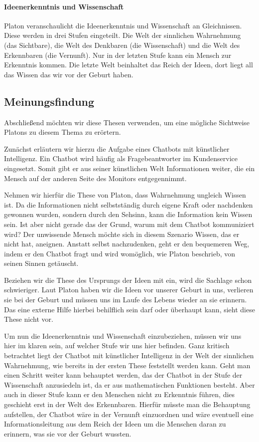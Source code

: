 \paragraph{Ideenerkenntnis und Wissenschaft}
Platon veranschaulicht die Ideenerkenntnis und Wissenschaft an Gleichnissen. Diese werden in drei Stufen eingeteilt. Die Welt der sinnlichen Wahrnehmung (das Sichtbare), die Welt des Denkbaren (die Wissenschaft) und die Welt des Erkennbaren (die Vernunft). Nur in der letzten Stufe kann ein Mensch zur Erkenntnis kommen. Die letzte Welt beinhaltet das Reich der Ideen, dort liegt all das Wissen das wir vor der Geburt haben.
	
\subsection{Meinungsfindung}
Abschließend möchten wir diese Thesen verwenden, um eine mögliche Sichtweise Platons zu diesem Thema zu erörtern.

Zunächst erläutern wir hierzu die Aufgabe eines Chatbots mit künstlicher Intelligenz. Ein Chatbot wird häufig als Fragebeantworter im Kundenservice eingesetzt. Somit gibt er aus seiner künstlichen Welt Informationen weiter, die ein Mensch auf der anderen Seite des Monitors entgegennimmt.

Nehmen wir hierfür die These von Platon, dass Wahrnehmung ungleich Wissen ist. Da die Informationen nicht selbstständig durch eigene Kraft oder  nachdenken gewonnen wurden, sondern durch den Sehsinn, kann die Information kein Wissen sein. Ist aber nicht gerade das der Grund, warum mit dem Chatbot kommuniziert wird? Der unwissende Mensch möchte sich in diesem Szenario Wissen, das er nicht hat, aneignen. Anstatt selbst nachzudenken, geht er den bequemeren Weg, indem er den Chatbot fragt und wird womöglich, wie Platon beschrieb, von seinen Sinnen getäuscht.

Beziehen wir die These des Ursprungs der Ideen mit ein, wird die Sachlage schon schwieriger. Laut Platon haben wir die Ideen vor unserer Geburt in uns, verlieren sie bei der Geburt und müssen uns im  Laufe des Lebens wieder an sie erinnern. Das eine externe Hilfe hierbei behilflich sein darf oder überhaupt kann, sieht diese These nicht vor.

Um nun die Ideenerkenntnis und Wissenschaft einzubeziehen, müssen wir uns hier im klaren sein, auf welcher Stufe wir uns hier befinden. Ganz kritisch betrachtet liegt der Chatbot mit künstlicher Intelligenz in der Welt der sinnlichen Wahrnehmung, wie bereits in der ersten These feststellt werden kann. Geht man einen Schritt weiter kann behauptet werden, das der Chatbot in der Stufe der Wissenschaft anzusiedeln ist, da er aus mathematischen Funktionen besteht. Aber auch in dieser Stufe kann er den Menschen nicht zu Erkenntnis führen, dies geschieht erst in der Welt des Erkennbaren. Hierfür müsste man die Behauptung aufstellen, der Chatbot wäre in der Vernunft einzuordnen und wäre eventuell eine Informationsleitung aus dem Reich der Ideen um die Menschen daran zu erinnern, was sie vor der Geburt wussten.

